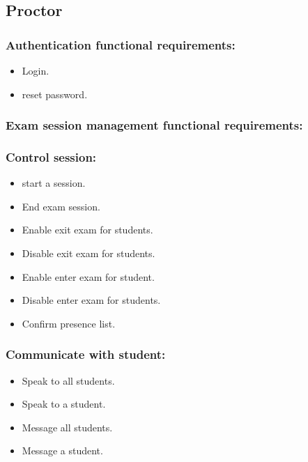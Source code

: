 \documentclass[a4paper,12p]{article}
\begin{document}
     \subsection{Proctor}
     \begin{itemize}
     \subsubsection{Authentication functional requirements:}
     \begin{itemize}
         \item Login.
         \item reset password.
     \end{itemize}

     \subsubsection{Exam session management functional requirements:}
     \begin{itemize}
        \subsubsection{Control session:}
         \begin{itemize}
             \item start a session.
             \item End exam session.
             \item Enable exit exam for students.
             \item Disable exit exam for students.
             \item Enable enter exam for student.
             \item Disable enter exam for students.
             \item Confirm presence list.
         \end{itemize}
         \subsubsection{Communicate with student:}
         \begin{itemize}
             \item Speak to all students.
             \item Speak to a student.
             \item Message all students.
             \item Message a student.
            \end{itemize}

\end{itemize}
\end{itemize}
\end{document}
